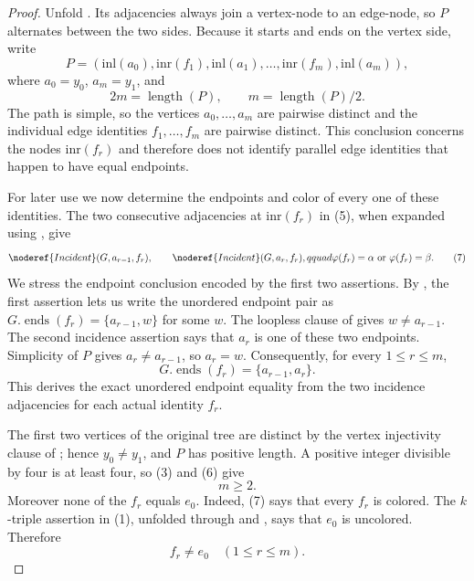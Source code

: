 \begin{proof}
Unfold .  Its adjacencies always join a
vertex-node to an edge-node, so $P$ alternates between the two sides.
Because it starts and ends on the vertex side, write
\[
 P=(\mathrm{inl}(a_0),\mathrm{inr}(f_1),\mathrm{inl}(a_1),
       \ldots,\mathrm{inr}(f_m),\mathrm{inl}(a_m)),                \tag{5}
\]
where $a_0=y_0$, $a_m=y_1$, and
\[
 2m=\operatorname{length}(P),\qquad
 m=\operatorname{length}(P)/2.                                   \tag{6}
\]
The path is simple, so the vertices $a_0,\ldots,a_m$ are pairwise
distinct and the individual edge identities $f_1,\ldots,f_m$ are
pairwise distinct.  This conclusion concerns the nodes
$\mathrm{inr}(f_r)$ and therefore does not identify parallel edge
identities that happen to have equal endpoints.

For later use we now determine the endpoints and color of every one of
these identities.  The two consecutive adjacencies at
$\mathrm{inr}(f_r)$ in (5), when expanded using
, give
\[
 \noderef{Incident}(G,a_{r-1},f_r),\qquad
 \noderef{Incident}(G,a_r,f_r),qquad
 \varphi(f_r)=\alpha\ \hbox{or}\ \varphi(f_r)=\beta.             \tag{7}
\]
We stress the endpoint conclusion encoded by the first two assertions.
By , the first assertion lets us write the unordered
endpoint pair as $G.\operatorname{ends}(f_r)=\{a_{r-1},w\}$ for some
$w$.  The loopless clause of  gives
$w\ne a_{r-1}$.  The second incidence assertion says that $a_r$ is one of
these two endpoints.  Simplicity of $P$ gives
$a_r\ne a_{r-1}$, so $a_r=w$.  Consequently, for every
$1\leq r\leq m$,
\[
       G.\operatorname{ends}(f_r)=\{a_{r-1},a_r\}.                \tag{8}
\]
This derives the exact unordered endpoint equality from the two incidence
adjacencies for each actual identity $f_r$.

The first two vertices of the original tree are distinct by the vertex
injectivity clause of ; hence $y_0\ne y_1$, and
$P$ has positive length.  A positive integer divisible by four is at
least four, so (3) and (6) give
\[
                         m\geq2.                                 \tag{9}
\]
Moreover none of the $f_r$ equals $e_0$.  Indeed, (7) says that every
$f_r$ is colored.  The $k$-triple assertion in (1), unfolded through
 and , says that $e_0$ is
uncolored.  Therefore
\[
                       f_r\ne e_0\quad(1\leq r\leq m).            \tag{10}
\]


\end{proof}
